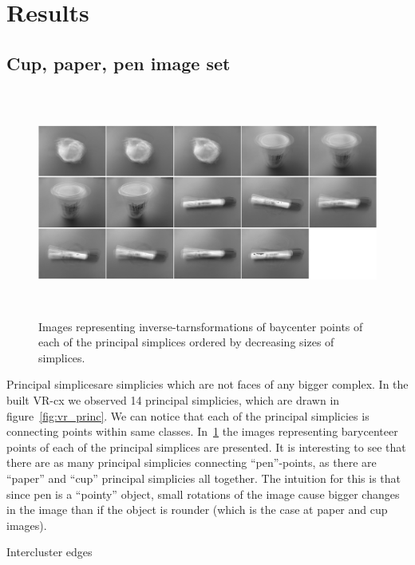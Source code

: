 \documentclass{article}
\newcommand{\enterProblemHeader}[1]{
}
\newcommand{\exitProblemHeader}[1]{
}
\newcounter{homeworkProblemCounter} %
\newcommand{\homeworkProblemName}{}
\newenvironment{homeworkProblem}[1][Problem \arabic{homeworkProblemCounter}]{ %
\stepcounter{homeworkProblemCounter} %
\renewcommand{\homeworkProblemName}{#1} %
\section{\homeworkProblemName} %
\enterProblemHeader{\homeworkProblemName} %
}{
\exitProblemHeader{\homeworkProblemName} %
}
\newcommand{\homeworkSectionName}{}
\newenvironment{homeworkSection}[1]{ %
\renewcommand{\homeworkSectionName}{#1} %
\subsection{\homeworkSectionName} %
\enterProblemHeader{\homeworkProblemName\ [\homeworkSectionName]} %
}{
\enterProblemHeader{\homeworkProblemName} %
}
\begin{document}
\begin{homeworkProblem}[Results]
\begin{homeworkSection}{Cup, paper, pen image set}
\begin{figure}[h]
    \centering
    \includegraphics[height=7.5cm]{img/princ}
    \caption{Images representing inverse-tarnsformations of baycenter points of each of the principal simplices ordered by decreasing sizes of simplices.}
    \label{fig:princ_barycenters}
\end{figure}

\begin{paragraph}{Principal simplices}are simplicies which are not faces of any bigger complex. In the built VR-cx we observed 14 principal simplicies, which are drawn in figure~\ref{fig:vr_princ}. We can notice that each of the principal simplicies is connecting points within same classes. In~\ref{fig:princ_barycenters} the images representing barycenteer points of each of the principal simplices are presented. It is interesting to see that there are as many principal simplicies connecting ``pen''-points, as there are ``paper'' and ``cup'' principal simplicies all together. The intuition for this is that since pen is a ``pointy'' object, small rotations of the image cause bigger changes in the image than if the object is rounder (which is the case at paper and cup images).

\end{paragraph}

\begin{paragraph}{Intercluster edges}  


\end{paragraph}
\end{homeworkSection}
\end{homeworkProblem}
\end{document}
